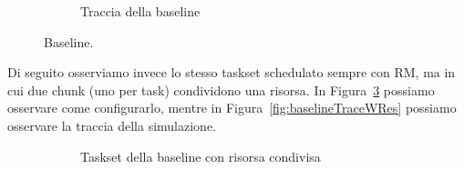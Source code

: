 \begin{figure}[htbp]
\begin{subfigure}{0.45\textwidth}
        \caption{Traccia della baseline}
        \label{fig:baselineTrace}
        \vfill
    \end{subfigure}
    \caption{Baseline.}
\end{figure}

\myskip

Di seguito osserviamo invece lo stesso taskset schedulato sempre con RM, ma in cui due chunk (uno per task) condividono una risorsa. In Figura~\ref{fig:baselineTasksetWRes} possiamo osservare come configurarlo, mentre in Figura~\ref{fig:baselineTraceWRes} possiamo osservare la traccia della simulazione.

\begin{figure}[htbp]
    \centering
    \begin{subfigure}{0.45\textwidth}
        \vfill
        \centering
        \caption{Taskset della baseline con risorsa condivisa}
        \label{fig:baselineTasksetWRes}
        \vfill
    \end{subfigure}
    \hfill
    \begin{subfigure}{0.45\textwidth}
        \vfill
        \centering

\end{subfigure}
\end{figure}
